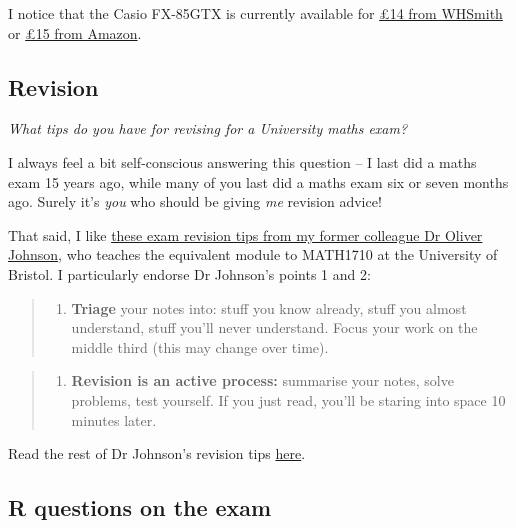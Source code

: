 \documentclass[
  letterpaper,
]{report}
\providecommand{\tightlist}{%
  \setlength{\itemsep}{0pt}\setlength{\parskip}{0pt}}\usepackage{longtable,booktabs,array}
\theoremstyle{definition}
\theoremstyle{definition}
\theoremstyle{remark}
\begin{document}
I notice that the Casio FX-85GTX is currently available for
\href{https://www.whsmith.co.uk/products/casio-fx85gtx-black-scientific-calculator/4549526607844.html}{£14
from WHSmith} or \href{https://www.amazon.co.uk/dp/B07L68RQCX}{£15 from
Amazon}.

\hypertarget{revision}{%
\subsection{Revision}\label{revision}}

\emph{What tips do you have for revising for a University maths exam?}

I always feel a bit self-conscious answering this question -- I last did
a maths exam 15 years ago, while many of you last did a maths exam six
or seven months ago. Surely it's \emph{you} who should be giving
\emph{me} revision advice!

That said, I like
\href{https://people.maths.bris.ac.uk/~maotj/notes/revise.png}{these
exam revision tips from my former colleague Dr Oliver Johnson}, who
teaches the equivalent module to MATH1710 at the University of Bristol.
I particularly endorse Dr Johnson's points 1 and 2:

\begin{quote}
\begin{enumerate}
\def\labelenumi{\arabic{enumi}.}
\tightlist
\item
  \textbf{Triage} your notes into: stuff you know already, stuff you
  almost understand, stuff you'll never understand. Focus your work on
  the middle third (this may change over time).
\end{enumerate}
\end{quote}

\begin{quote}
\begin{enumerate}
\def\labelenumi{\arabic{enumi}.}
\setcounter{enumi}{1}
\tightlist
\item
  \textbf{Revision is an active process:} summarise your notes, solve
  problems, test yourself. If you just read, you'll be staring into
  space 10 minutes later.
\end{enumerate}
\end{quote}

Read the rest of Dr Johnson's revision tips
\href{https://people.maths.bris.ac.uk/~maotj/notes/revise.png}{here}.

\hypertarget{r-questions-on-the-exam}{%
\subsection{R questions on the exam}\label{r-questions-on-the-exam}}
\end{document}
